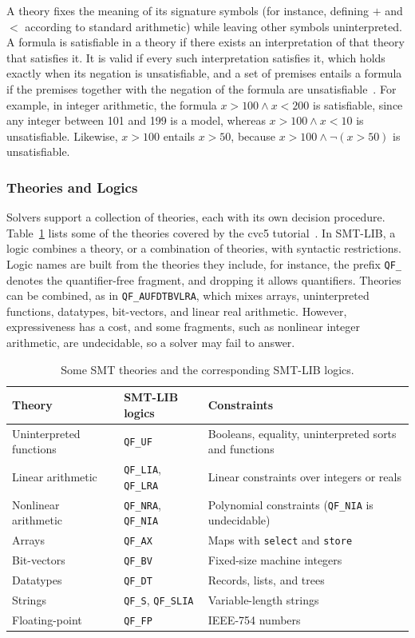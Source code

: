 A theory fixes the meaning of its signature symbols (for instance, defining $+$ and $<$ according to standard arithmetic) while leaving other symbols uninterpreted. A formula is satisfiable in a theory if there exists an interpretation of that theory that satisfies it. It is valid if every such interpretation satisfies it, which holds exactly when its negation is unsatisfiable, and a set of premises entails a formula if the premises together with the negation of the formula are unsatisfiable~\cite{barrett2024tutorial}. For example, in integer arithmetic, the formula $x > 100 \wedge x < 200$ is satisfiable, since any integer between 101 and 199 is a model, whereas $x > 100 \wedge x < 10$ is unsatisfiable. Likewise, $x > 100$ entails $x > 50$, because $x > 100 \wedge \neg(x > 50)$ is unsatisfiable.

\subsubsection{Theories and Logics}
Solvers support a collection of theories, each with its own decision procedure. Table~\ref{tab:smt-theories} lists some of the theories covered by the cvc5 tutorial~\cite{barrett2024tutorial}. In SMT-LIB, a logic combines a theory, or a combination of theories, with syntactic restrictions. Logic names are built from the theories they include, for instance, the prefix \texttt{QF\_} denotes the quantifier-free fragment, and dropping it allows quantifiers. Theories can be combined, as in \texttt{QF\_AUFDTBVLRA}, which mixes arrays, uninterpreted functions, datatypes, bit-vectors, and linear real arithmetic. However, expressiveness has a cost, and some fragments, such as nonlinear integer arithmetic, are undecidable, so a solver may fail to answer.

\begin{table}[ht]
\centering
\begin{tabular}{@{}llp{7.6cm}@{}}
\toprule
\textbf{Theory} & \textbf{SMT-LIB logics} & \textbf{Constraints} \\
\midrule
Uninterpreted functions & \texttt{QF\_UF} & Booleans, equality, uninterpreted sorts and functions \\
Linear arithmetic & \texttt{QF\_LIA}, \texttt{QF\_LRA} & Linear constraints over integers or reals \\
Nonlinear arithmetic & \texttt{QF\_NRA}, \texttt{QF\_NIA} & Polynomial constraints (\texttt{QF\_NIA} is undecidable) \\
Arrays & \texttt{QF\_AX} & Maps with \texttt{select} and \texttt{store} \\
Bit-vectors & \texttt{QF\_BV} & Fixed-size machine integers \\
Datatypes & \texttt{QF\_DT} & Records, lists, and trees \\
Strings & \texttt{QF\_S}, \texttt{QF\_SLIA} & Variable-length strings \\
Floating-point & \texttt{QF\_FP} & IEEE-754 numbers \\
\bottomrule
\end{tabular}
\caption{Some SMT theories and the corresponding SMT-LIB logics.}
\label{tab:smt-theories}
\end{table}

